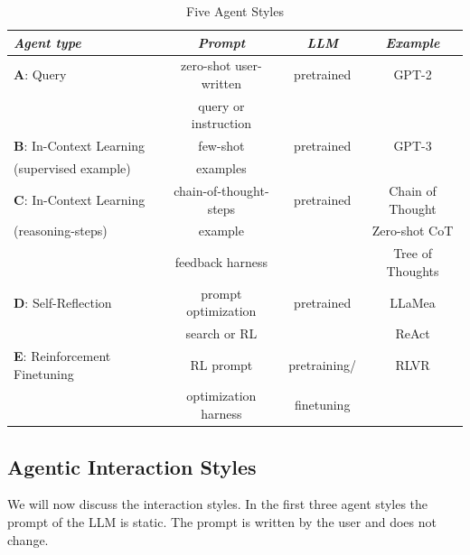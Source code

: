 \begin{table}
\footnotesize\centering
\begin{tabular}{l|c|c|c}
{\em Agent type} & {\em Prompt} & {\em LLM}  & {\em Example} \\ \hline
{\bf A}: Query & zero-shot user-written  & pretrained   & GPT-2 \citep{vaswani2017attention}\\
 &  query or instruction &   & \\ \hline
{\bf B}: In-Context Learning  & few-shot   & pretrained   & GPT-3 \citep{brown2020language}\\ 
(supervised example) &  examples &    & \\ \hline
{\bf C}: In-Context Learning  & chain-of-thought-steps  & pretrained   & Chain of Thought \citep{wei2022chain}\\ 
(reasoning-steps)&  example &    & Zero-shot CoT \citep{kojima2022large}\\ \hline
 & feedback harness   &   & Tree of Thoughts \citep{yao2024tree}\\
{\bf D}: Self-Reflection  & prompt optimization & pretrained   &  LLaMea \citep{van2024llamea}\\
 & search or RL&   &   ReAct \citep{yao2022react}\\ \hline
{\bf E}: Reinforcement Finetuning  & RL prompt  & pretraining/   & RLVR  \citep{lambert2024tulu}\\ 
 & optimization harness & finetuning   & \\ 
\end{tabular} 
    \caption{Five Agent Styles}\label{tab:fourstyles}
\end{table}





\subsection{Agentic Interaction Styles}
We will now discuss the interaction styles. In the first three agent styles the prompt of the LLM is static. The prompt is
written by the user and does not change. 



